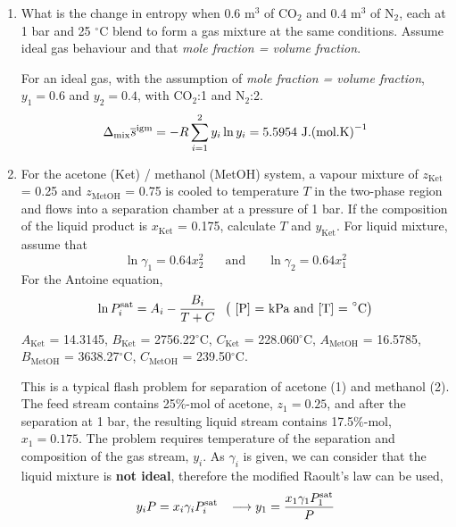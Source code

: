 \begin{enumerate}[1)]
   \item\label{Mod05Ex06} What is the change in entropy when 0.6 m$^{3}$ of CO$_{2}$ and 0.4 m$^{3}$ of N$_{2}$, each at 1 bar and 25 $^{\circ}$C blend to form a gas mixture at the same conditions. Assume ideal gas behaviour and that {\it mole fraction = volume fraction}. 

        For an ideal gas, with the assumption of {\it mole fraction = volume fraction}, \ie $y_{1} = 0.6$ and $y_{2} = 0.4$, with CO$_{2}$:1 and N$_{2}$:2.
      \begin{displaymath}
          \Delta_{\text{mix}}\overline{s}^{\text{igm}} = -R\summation[y_{i}\ln{y_{i}}]{i=1}{2} = 5.5954 \text{ J.(mol.K)}^{-1}
      \end{displaymath}


\clearpage
            
   \item\label{Mod05Ex07}  For the acetone (Ket) / methanol (MetOH) system, a vapour mixture of $z_{\text{Ket}}$ = 0.25 and $z_{\text{MetOH}}$ = 0.75 is cooled to temperature $T$ in the two-phase region and flows into a separation chamber at a pressure of 1 bar. If the composition of the liquid product is $x_{\text{Ket}}$ = 0.175, calculate $T$  and $y_{\text{Ket}}$. For liquid mixture, assume that
\begin{displaymath}
\ln\gamma_{1} = 0.64x_{2}^{2} \;\;\;\;\;\text{ and }\;\;\;\;\;\ln\gamma_{2}=0.64x_{1}^{2}
\end{displaymath}
For the Antoine equation, 
\begin{displaymath}
\ln P_{i}^{\text{sat}} = A_{i} - \frc{B_{i}}{T + C} \;\;\left(\text{ [P] = kPa and [T] = }^{\circ}\text{C}\right)
\end{displaymath}
$A_{\text{Ket}}$ = 14.3145, $B_{\text{Ket}}$ = 2756.22$^{\circ}$C, $C_{\text{Ket}}$ = 228.060$^{\circ}$C, $A_{\text{MetOH}}$ = 16.5785, $B_{\text{MetOH}}$ = 3638.27$^{\circ}$C, $C_{\text{MetOH}}$ = 239.50$^{\circ}$C.

        This is a typical flash problem for separation of acetone (1) and methanol (2). The feed stream contains 25$\%$-mol of acetone, \ie $z_{1}=0.25$, and after the separation at 1 bar, the resulting liquid stream contains 17.5$\%$-mol, \ie $x_{1}=0.175$. The problem requires temperature of the separation and composition of the gas stream, $y_{i}$. As $\gamma_{i}$ is given, we can consider that the liquid mixture is {\bf not ideal}, therefore the modified Raoult's law can be used,
\begin{displaymath}
    y_{i}P = x_{i}\gamma_{i}P_{i}^{\text{sat}} \;\;\;\longrightarrow y_{1}=\frc{x_{1}\gamma_{1}P_{1}^{\text{sat}}}{P}
\end{displaymath}
    

\end{enumerate}
